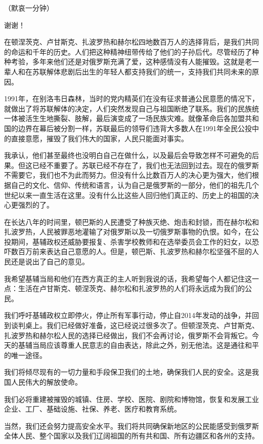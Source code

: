 \documentclass[UTF8, 11pt, oneside]{ctexart}
\begin{document}
（默哀一分钟）

谢谢！

在顿涅茨克、卢甘斯克、扎波罗热和赫尔松四地数百万人的选择背后，是我们共同的命运和千年的历史。人们把这种精神纽带传给了他们的子孙后代。尽管经历了种种考验，多年来他们还是对俄罗斯充满了爱，这种感情没有人能摧毁。这就是老一辈人和在苏联解体悲剧后出生的年轻人都支持我们的统一，支持我们共同未来的原因。

1991年，在别洛韦日森林，当时的党内精英们在没有征求普通公民意愿的情况下，就做出了将苏联解体的决定，人们突然发现自己与祖国断绝了联系。我们的民族统一体被活生生地撕裂、肢解，最后演变成了一场民族灾难。就像革命后各加盟共和国的边界在幕后被分割一样，苏联最后的领导们违背大多数人在1991年全民公投中的直接意愿，摧毁了我们伟大的国家，人民只能面对事实。

我承认，他们甚至最终也没明白自己在做什么，以及最后会导致怎样不可避免的后果。但这已经不重要了。苏联已经不存在了，我们也无法回到过去。现在的俄罗斯不需要它，我们也不为此而努力。但没有什么比数百万人的决心更为强大，他们根据自己的文化、信仰、传统和语言，认为自己是俄罗斯的一部分，他们的祖先几个世纪以来一直生活在这里。没有什么比这些人回归他们真正的、历史上的祖国的决心更强烈的了。

在长达八年的时间里，顿巴斯的人民遭受了种族灭绝、炮击和封锁，而在赫尔松和扎波罗热，人民被罪恶地灌输了对俄罗斯以及一切俄罗斯事物的仇恨。如今，在公投期间，基辅政权还威胁要报复、杀害学校教师和在选举委员会工作的妇女，以恐吓数百万前来表达自己意愿的人。但是，顿巴斯、扎波罗热和赫尔松坚强不屈的人民还是说出了自己的意见。

我希望基辅当局和他们在西方真正的主人听到我说的话，我希望每个人都记住这一点：生活在卢甘斯克、顿涅茨克、赫尔松和扎波罗热的人们将永远成为我们的公民。

我们呼吁基辅政权立即停火，停止所有军事行动，停止自2014年发动的战争，并回到谈判桌上。我们已经做好准备，这已经说过很多次了。但顿涅茨克、卢甘斯克、扎波罗热和赫尔松人民的选择已经做出，我们不会再讨论，俄罗斯不会背叛它。今天的基辅当局应该尊重人民意志的自由表达，除此之外，别无他法。这是通往和平的唯一途径。

我们将倾尽现有的一切力量和手段保卫我们的土地，确保我们人民的安全。这是我国人民伟大的解放使命。

我们必将重建被摧毁的城镇、住房、学校、医院、剧院和博物馆，恢复和发展工业企业、工厂、基础设施、社保、养老、医疗和教育系统。

当然，我们还会努力提高安全水平。我们将共同确保新地区的公民能感受到俄罗斯全体人民、整个国家以及我们辽阔祖国的所有共和国、所有边疆区和各州的支持。
\end{document}
